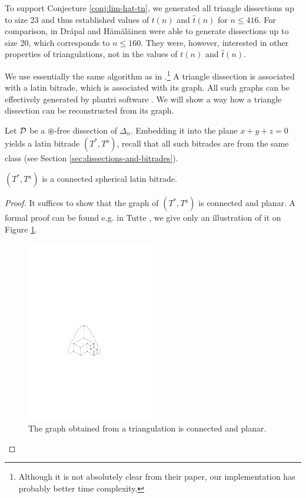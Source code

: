 To support Conjecture \ref{conj:lim-hat-tn}, we generated all triangle dissections up to size 23 and thus established values of $t(n)$ and $\hat t(n)$ for $n \leq 416$. For comparison, in \cite{DrapalHamalainen10} Drápal and Hämäläinen were able to generate dissections up to size 20, which corresponds to $n \leq 160$. They were, however, interested in other properties of triangulations, not in the values of $t(n)$ and $\hat t(n)$.

We use essentially the same algorithm as in \cite{DrapalHamalainen10}.\footnote{Although it is not absolutely clear from their paper, our implementation has probably better time complexity.} A triangle dissection is associated with a latin bitrade, which is associated with its graph. All such graphs can be effectively generated by plantri software \cite{BrinkmannMcKay99}. We will show a way how a triangle dissection can be reconstructed from its graph.

\bigskip

Let $\mathcal D$ be a $\circledast$-free dissection of $\Delta_n$. Embedding it into the plane $x+y+z=0$ yields a latin bitrade $(T^*, T^\vartriangle)$, recall that all such bitrades are from the same class (see Section \ref{sec:dissections-and-bitrades}).

\begin{lem}
$(T^*, T^\vartriangle)$ is a connected spherical latin bitrade.
\end{lem}
\begin{proof}
It suffices to show that the graph of $(T^*, T^\vartriangle)$ is connected and planar. A formal proof can be found e.g. in Tutte \cite{Tutte48}, we give only an illustration of it on Figure \ref{fig:triangulation-graph}.

\begin{figure}[htb]
\centering
\includegraphics[width=0.5\textwidth]{img/triangulation_graph.pdf}
\caption{The graph obtained from a triangulation is connected and planar.}
\label{fig:triangulation-graph}
\end{figure}
\end{proof}

